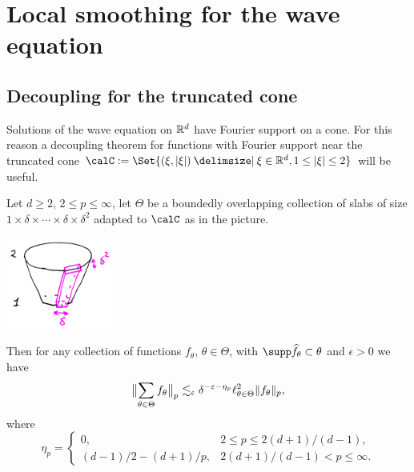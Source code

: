 \section{Local smoothing for the wave equation}
\subsection{Decoupling for the truncated cone}
Solutions of the wave equation on $\mathbb{R}^{d}$ have Fourier support on a cone.
For this reason a decoupling theorem for functions with Fourier support near the truncated cone $\calC := \Set{(\xi,\abs{\xi}) \given \xi\in\R^{d}, 1 \leq \abs{\xi} \leq 2}$ will be useful.
\begin{theorem}[{\cite[Section 8]{MR3374964}}]
\label{thm:dec-cone}
Let $d\geq 2$, $2 \leq p \leq \infty$, let $\Theta$ be a boundedly overlapping collection of slabs of size $1 \times \delta \times \dotsm \times \delta \times \delta^{2}$ adapted to $\calC$ as in the picture.
\begin{center}
\includegraphics[height=3cm]{cone-slabs.png}
\end{center}
Then for any collection of functions $f_{\theta}$, $\theta\in\Theta$, with $\supp \widehat{f_{\theta}} \subset \theta$ and $\epsilon>0$ we have
\begin{equation}
\label{eq:dec-cone}
\norm[\big]{\sum_{\theta\in\Theta} f_{\theta}}_{p}
\lesssim_{\epsilon} \delta^{-\epsilon-\eta_{p}} \ell^{2}_{\theta\in\Theta} \norm{f_{\theta}}_{p},
\end{equation}
where
\[
\eta_{p} =
\begin{cases}
0, & 2 \leq p \leq 2(d+1)/(d-1),\\
(d-1)/2-(d+1)/p, & 2(d+1)/(d-1) < p \leq \infty.
\end{cases}
\]
\end{theorem}
